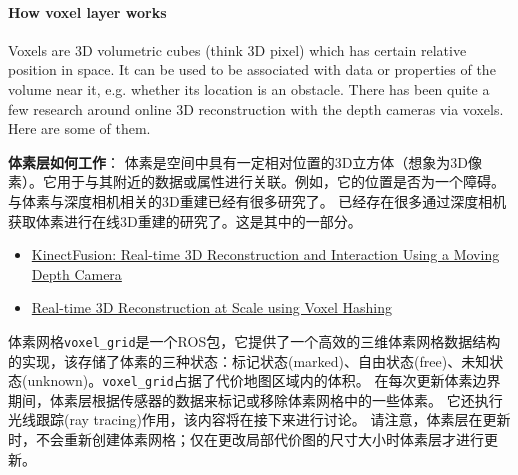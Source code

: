\paragraph{How voxel layer works} Voxels are 3D volumetric cubes (think 3D pixel) which has certain relative position in space. It can be used to be associated with data or properties of the volume near it, e.g. whether its location is an obstacle. There has been quite a few research around online 3D reconstruction with the depth cameras via voxels. Here are some of them.

\textbf{体素层如何工作}：
体素是空间中具有一定相对位置的3D立方体（想象为3D像素）。它用于与其附近的数据或属性进行关联。例如，它的位置是否为一个障碍。
与体素与深度相机相关的3D重建已经有很多研究了。
已经存在很多通过深度相机获取体素进行在线3D重建的研究了。这是其中的一部分。

\begin{itemize}
	\item \href{http://delivery.acm.org/10.1145/2050000/2047270/p559-izadi.pdf?ip=128.208.7.188&id=2047270&acc=ACTIVE\%20SERVICE&key=B63ACEF81C6334F5\%2EF43F328D6C8418D0\%2E4D4702B0C3E38B35\%2E4D4702B0C3E38B35&CFID=830915711&CFTOKEN=23054788&__acm__=1472349664_9fd28ae246d72a507f6a93c5ac84a516}{KinectFusion: Real-time 3D Reconstruction and Interaction Using a Moving Depth Camera} 
	\item \href{https://people.mpi-inf.mpg.de/~mzollhoef/Papers/SGASIA2013_VH/paper.pdf}{Real-time 3D Reconstruction at Scale using Voxel Hashing}
\end{itemize}


体素网格\texttt{voxel\_grid}是一个ROS包，它提供了一个高效的三维体素网格数据结构的实现，该存储了体素的三种状态：标记状态(marked)、自由状态(free)、未知状态(unknown)。\texttt{voxel\_grid}占据了代价地图区域内的体积。
在每次更新体素边界期间，体素层根据传感器的数据来标记或移除体素网格中的一些体素。
它还执行光线跟踪(ray tracing)作用，该内容将在接下来进行讨论。
请注意，体素层在更新时，不会重新创建体素网格；仅在更改局部代价图的尺寸大小时体素层才进行更新。

